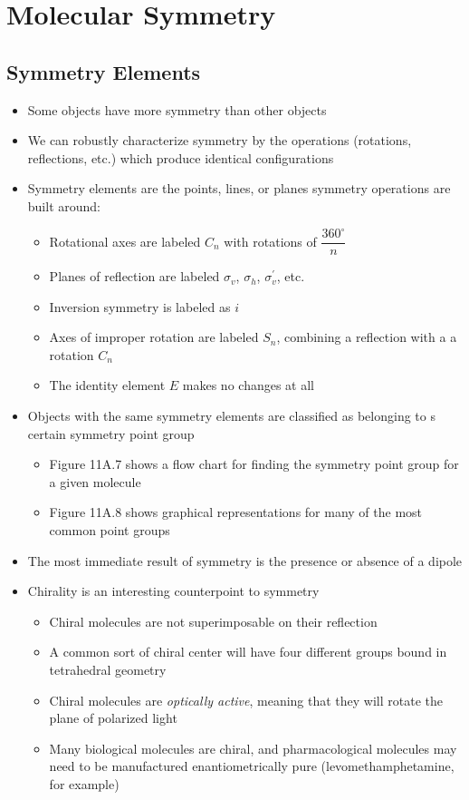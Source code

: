 \documentclass[12pt, openany, letterpaper]{memoir}
\begin{document}
\chapter{Molecular Symmetry}
\section{Symmetry Elements}
\begin{itemize}
	\item Some objects have more symmetry than other objects
	\item We can robustly characterize symmetry by the operations (rotations, reflections, etc.) which produce identical configurations
	\item Symmetry elements are the points, lines, or planes symmetry operations are built around:
	\begin{itemize}
		\item Rotational axes are labeled $C_n$ with rotations of $\dfrac{360^{\circ}}{n}$
		\item Planes of reflection are labeled $\sigma_v$, $\sigma_h$, $\sigma_v^\prime$, etc.
		\item Inversion symmetry is labeled as $i$
		\item Axes of improper rotation are labeled $S_n$, combining a reflection with a a rotation $C_n$
		\item The identity element $E$ makes no changes at all
	\end{itemize}
	\item Objects with the same symmetry elements are classified as belonging to s certain symmetry point group
	\begin{itemize}
		\item Figure 11A.7 shows a flow chart for finding the symmetry point group for a given molecule
		\item Figure 11A.8 shows graphical representations for many of the most common point groups
	\end{itemize}
	\item The most immediate result of symmetry is the presence or absence of a dipole
	\item Chirality is an interesting counterpoint to symmetry
	\begin{itemize}
		\item Chiral molecules are not superimposable on their reflection
		\item A common sort of chiral center will have four different groups bound in tetrahedral geometry
		\item Chiral molecules are \emph{optically active}, meaning that they will rotate the plane of polarized light
		\item Many biological molecules are chiral, and pharmacological molecules may need to be manufactured enantiometrically pure (levomethamphetamine, for example)
	\end{itemize}
\end{itemize}
\end{document}
